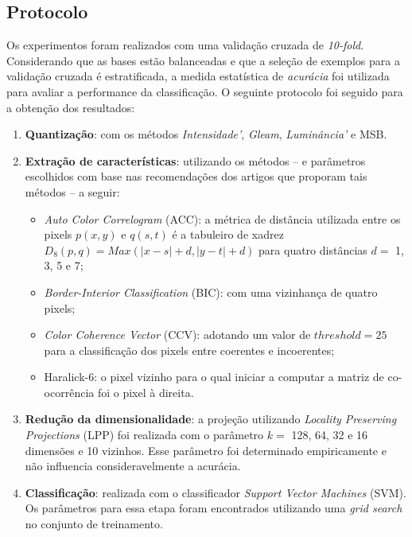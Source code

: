 \subsection{Protocolo}

Os experimentos foram realizados com uma validação cruzada de \textit{10-fold}. Considerando que as bases estão balanceadas e que a seleção de exemplos para a validação cruzada é estratificada, a medida estatística de \textit{acurácia} foi utilizada para avaliar a performance da classificação. O seguinte protocolo foi seguido para a obtenção dos resultados:

\begin{enumerate}
\item \textbf{Quantização}: com os métodos \emph{Intensidade'}, \emph{Gleam}, \emph{Luminância'} e MSB.
\item \textbf{Extração de características}: utilizando os métodos -- e parâmetros escolhidos com base nas recomendações dos artigos que proporam tais métodos -- a seguir:
  \begin{itemize}
    \item \textit{Auto Color Correlogram} (ACC): a métrica de distância utilizada entre os pixels $p(x,y)$ e $q(s,t)$ é a tabuleiro de xadrez $D_8(p,q) = Max(|x-s| + d, |y-t| + d)$ para quatro distâncias $d =$ 1, 3, 5 e 7;
    \item \textit{Border-Interior Classification} (BIC): com uma vizinhança de quatro pixels;
    \item \textit{Color Coherence Vector} (CCV): adotando um valor de $\mathit{threshold} = 25$ para a classificação dos pixels entre coerentes e incoerentes;
    \item Haralick-6: o pixel vizinho para o qual iniciar a computar a matriz de co-ocorrência foi o pixel à direita.
  \end{itemize}
\item \textbf{Redução da dimensionalidade}: a projeção utilizando \textit{Locality Preserving Projections} (LPP) foi realizada com o parâmetro $k =$ 128, 64, 32 e 16 dimensões e 10 vizinhos. Esse parâmetro foi determinado empiricamente e não influencia consideravelmente a acurácia.
\item \textbf{Classificação}: realizada com o classificador \textit{Support Vector Machines} (SVM). Os parâmetros para essa etapa foram encontrados utilizando uma \textit{grid search} no conjunto de treinamento.
\end{enumerate}

